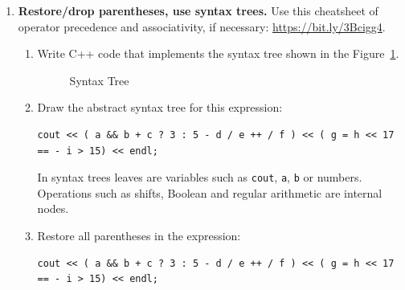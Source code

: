 \documentclass[a4paper,12pt]{article}
\begin{document}
\begin{enumerate}[label=1.\Alph*.]

\item {\bf Restore/drop parentheses, use syntax trees.}
Use this cheatsheet of operator precedence and associativity, if necessary: \url{https://bit.ly/3Bcigg4}.
\begin{enumerate}
\item Write C++ code that implements the syntax tree shown in the Figure~\ref{fig:abstract-syntax-tree}.
\begin{figure}[!htb]
\caption{\label{fig:abstract-syntax-tree} Syntax Tree}
\end{figure}
\item Draw the abstract syntax tree for this expression: 
\begin{verbatim}
cout << ( a && b + c ? 3 : 5 - d / e ++ / f ) << ( g = h << 17 
== - i > 15) << endl;
\end{verbatim}
In syntax trees leaves are variables such as {\tt cout}, {\tt a}, {\tt b} or numbers. 
Operations such as shifts, Boolean and regular arithmetic are internal nodes.
\item Restore all parentheses in the expression:
\begin{verbatim}
cout << ( a && b + c ? 3 : 5 - d / e ++ / f ) << ( g = h << 17 
== - i > 15) << endl;
\end{verbatim}
\end{enumerate}


\end{enumerate}
\end{document}
